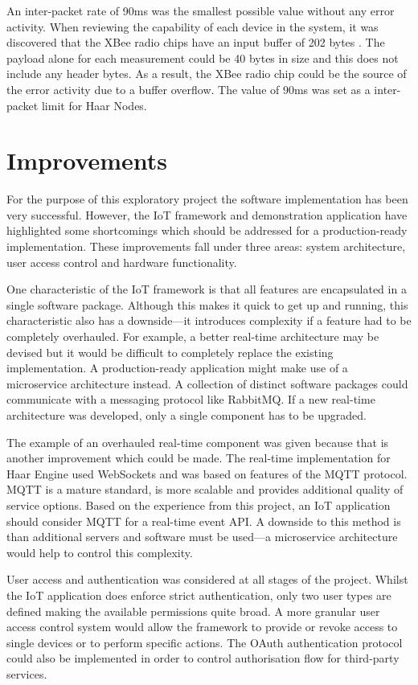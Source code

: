     An inter-packet rate of 90ms was the smallest possible value without any error activity. When reviewing the capability of each device in the system, it was discovered that the XBee radio chips have an input buffer of 202 bytes \citep{xbee-manual}. The payload alone for each measurement could be 40 bytes in size and this does not include any header bytes. As a result, the XBee radio chip could be the source of the error activity due to a buffer overflow. The value of 90ms was set as a inter-packet limit for Haar Nodes.

  \section{Improvements}
    For the purpose of this exploratory project the software implementation has been very successful. However, the IoT framework and demonstration application have highlighted some shortcomings which should be addressed for a production-ready implementation. These improvements fall under three areas: system architecture, user access control and hardware functionality.

    One characteristic of the IoT framework is that all features are encapsulated in a single software package. Although this makes it quick to get up and running, this characteristic also has a downside---it introduces complexity if a feature had to be completely overhauled. For example, a better real-time architecture may be devised but it would be difficult to completely replace the existing implementation. A production-ready application might make use of a microservice architecture instead. A collection of distinct software packages could communicate with a messaging protocol like RabbitMQ. If a new real-time architecture was developed, only a single component has to be upgraded.

    The example of an overhauled real-time component was given because that is another improvement which could be made. The real-time implementation for Haar Engine used WebSockets and was based on features of the MQTT protocol. MQTT is a mature standard, is more scalable and provides additional quality of service options. Based on the experience from this project, an IoT application should consider MQTT for a real-time event API. A downside to this method is than additional servers and software must be used---a microservice architecture would help to control this complexity.

    User access and authentication was considered at all stages of the project. Whilst the IoT application does enforce strict authentication, only two user types are defined making the available permissions quite broad. A more granular user access control system would allow the framework to provide or revoke access to single devices or to perform specific actions. The OAuth authentication protocol could also be implemented in order to control authorisation flow for third-party services.

